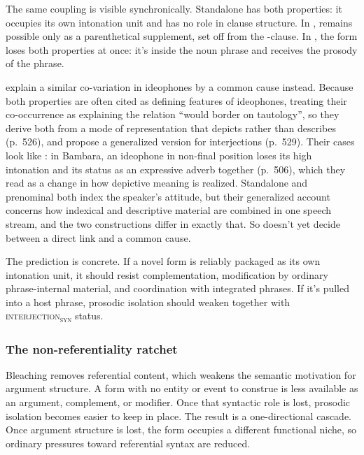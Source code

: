 \documentclass[12pt]{article}
\newcommand{\intj}[1]{\textsc{interjection\textsubscript{#1}}}
\begin{document}
The same coupling is visible synchronically. Standalone
 has both properties: it occupies its own intonation unit
and has no role in clause structure. In ,  remains possible only as a
parenthetical supplement, set off from the -clause. In
, the form loses both properties at once: it's
inside the noun phrase and receives the prosody of the phrase.

\textcite{dingemanseakita2017} explain a similar co-variation in ideophones by
a common cause instead. Because both properties are often cited as defining
features of ideophones, treating their co-occurrence as explaining the
relation \enquote{would border on tautology}, so they derive both from a mode
of representation that depicts rather than describes (p.~526), and propose a
generalized version for interjections (p.~529). Their cases look like
: in Bambara, an ideophone in non-final position loses
its high intonation and its status as an expressive adverb together
(p.~506), which they read as a change in how depictive meaning is realized.
Standalone and prenominal  both index the speaker's attitude,
but their generalized account concerns how indexical and descriptive material
are combined in one speech stream, and the two constructions differ in
exactly that. So  doesn't yet decide between a direct link and
a common cause.

The prediction is concrete. If a novel form is reliably
packaged as its own intonation unit, it should resist complementation,
modification by ordinary phrase-internal material, and coordination with
integrated phrases. If it's pulled into a host phrase, prosodic isolation should
weaken together with \intj{syn} status.

\subsubsection{The non-referentiality ratchet}

Bleaching removes referential content, which weakens the semantic
motivation for argument structure. A form with no entity or event to
construe is less available as an argument, complement, or modifier. Once
that syntactic role is lost, prosodic isolation becomes easier to keep
in place. The result is a one-directional cascade. Once argument
structure is lost, the form occupies a different functional niche, so
ordinary pressures toward referential syntax are reduced.
\end{document}
